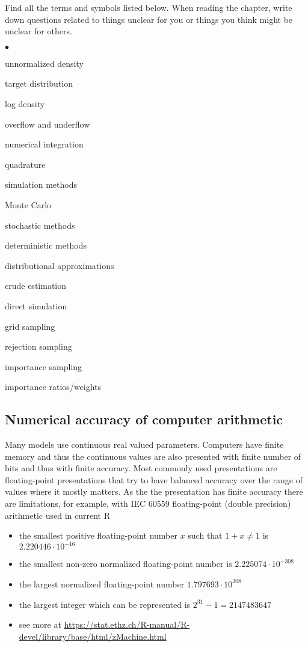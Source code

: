 \documentclass[a4paper,11pt,english]{article}
\begin{document}
Find all the terms and symbols listed below. When reading the chapter,
write down questions related to things unclear for you or things you
think might be unclear for others. 
\begin{list}{$\bullet$}{\parsep=0pt\itemsep=2pt}
\item unnormalized density
\item target distribution
\item log density
\item overflow and underflow
\item numerical integration
\item quadrature
\item simulation methods
\item Monte Carlo
\item stochastic methods
\item deterministic methods
\item distributional approximations
\item crude estimation
\item direct simulation
\item grid sampling
\item rejection sampling
\item importance sampling
\item importance ratios/weights
\end{list}

 \subsection*{Numerical accuracy of computer arithmetic}

 Many models use continuous real valued parameters. Computers have finite memory and thus the continuous values are also presented with finite number of bits and thus with finite accuracy. Most commonly used presentations are floating-point presentations that try to have balanced accuracy over the range of values where it mostly matters. As the the presentation has finite accuracy there are limitations, for example, with IEC 60559 floating-point (double precision) arithmetic used in current R
 \begin{itemize}
 \item the smallest positive floating-point number $x$ such that $1 + x \neq 1$ is $2.220446\cdot 10^{-16}$
 \item the smallest non-zero normalized floating-point number is $2.225074\cdot 10^{-308}$
 \item the largest normalized floating-point number $1.797693\cdot 10^{308}$
 \item the largest integer which can be represented is $2^{31} - 1 = 2147483647$
 \item see more at \url{https://stat.ethz.ch/R-manual/R-devel/library/base/html/zMachine.html}
 \end{itemize}
\end{document}
